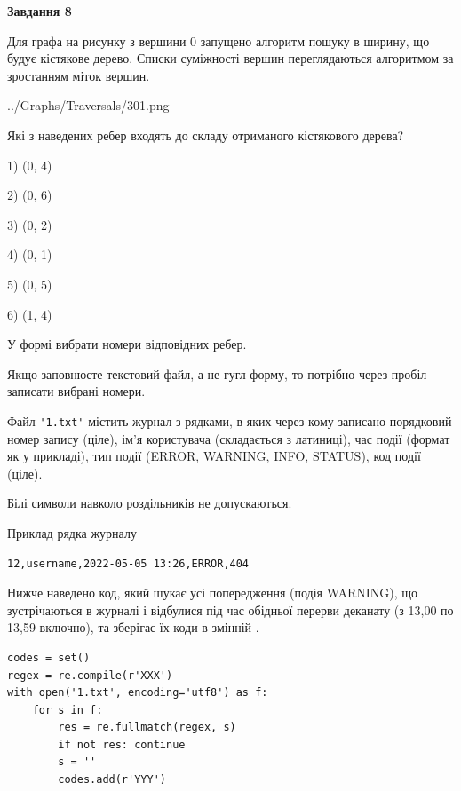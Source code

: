 \documentclass[12pt, ukrainian]{article}
\def\code#1{\Verb!#1!}
\begin{document}
{\begin {large}
{\begin {center}\textbf{Завдання 8}\end {center}}\par
Для графа на рисунку з вершини 0 запущено алгоритм пошуку в ширину, що будує кістякове дерево. Списки суміжності вершин переглядаються алгоритмом за зростанням міток вершин.\par
\begin{center}
	{../Graphs/Traversals/301.png}
\end{center}
\par Які з наведених ребер входять до складу отриманого кістякового дерева?\par
1) (0, 4)\par
2) (0, 6)\par
3) (0, 2)\par
4) (0, 1)\par
5) (0, 5)\par
6) (1, 4)\par
{\vskip 15pt} У формі вибрати номери відповідних ребер.


Якщо заповнюєте текстовий файл, а не гугл-форму, то потрібно через пробіл записа\-ти вибрані номери.\par
\newpage


Файл \code{'1.txt'} містить журнал з рядками, в яких через кому записано поряд\-ко\-вий номер запису (ціле), ім'я користувача (складається з латиниці), час події (фор\-мат як у прикладі), тип події (ERROR, WARNING, INFO, STATUS), код події (ціле).

Білі символи навколо роздільників не допускаються.

Приклад рядка журналу



\begin{verbatim}
12,username,2022-05-05 13:26,ERROR,404
\end{verbatim}


Нижче наведено код, який шукає усі попередження (подія WARNING), що зустрі\-ча\-ються в журналі і відбулися під час обідньої перерви деканату (з 13,00 по 13,59 включно), та зберігає їх коди в змінній .



\begin{verbatim}
codes = set()
regex = re.compile(r'XXX')
with open('1.txt', encoding='utf8') as f:
    for s in f:
        res = re.fullmatch(regex, s)
        if not res: continue
        s = ''
        codes.add(r'YYY')
\end{verbatim}





\end{large}}
\end{document}
